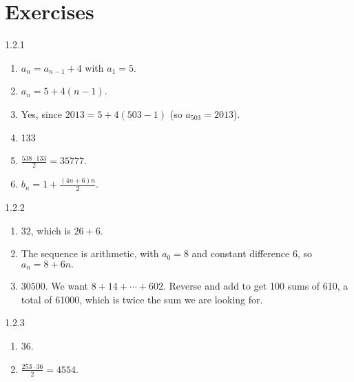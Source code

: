 \documentclass[11pt,]{book}
\theoremstyle{ptxplainnotitle}
\theoremstyle{ptxplaintitle}
\theoremstyle{ptxdefinitionnotitle}
\theoremstyle{ptxdefinitiontitle}
\theoremstyle{ptxdefinitionnotitle}
\theoremstyle{ptxdefinitiontitle}
\theoremstyle{ptxdefinitionnotitle}
\theoremstyle{ptxdefinitiontitle}
\theoremstyle{ptxdefinitiontitlenonumber}
\theoremstyle{ptxdefinitiontitlenonumber}
\numberwithin{equation}{chapter}
\begin{document}
\section*{Exercises}
\begin{divisionexercise}{1.2.1}
\textbf{}\hypertarget{p-228}{}%
\leavevmode%
\begin{enumerate}[label=(\alph*)]
\item\hypertarget{li-126}{}\(a_n = a_{n-1} + 4\) with \(a_1 = 5\).%
\item\hypertarget{li-127}{}\(a_n = 5 + 4(n-1)\).%
\item\hypertarget{li-128}{}\hypertarget{p-229}{}%
Yes, since \(2013 = 5 + 4(503-1)\) (so \(a_{503} = 2013\)).%
\item\hypertarget{li-129}{}\hypertarget{p-230}{}%
133%
\item\hypertarget{li-130}{}\(\frac{538\cdot 133}{2} = 35777\).%
\item\hypertarget{li-131}{}\(b_n = 1 + \frac{(4n+6)n}{2}\).%
\end{enumerate}
%
\end{divisionexercise}%
\begin{divisionexercise}{1.2.2}
\textbf{}\hypertarget{p-245}{}%
\leavevmode%
\begin{enumerate}[label=(\alph*)]
\item\hypertarget{li-141}{}\hypertarget{p-246}{}%
\(32\text{,}\) which is \(26+6\text{.}\)%
\item\hypertarget{li-142}{}\hypertarget{p-247}{}%
The sequence is arithmetic, with \(a_0 = 8\) and constant difference 6, so \(a_n = 8 + 6n\text{.}\)%
\item\hypertarget{li-143}{}\hypertarget{p-248}{}%
\(30500\text{.}\)  We want \(8 + 14 + \cdots + 602\text{.}\)  Reverse and add to get 100 sums of 610, a total of 61000, which is twice the sum we are looking for.%
\end{enumerate}
%
\end{divisionexercise}%
\begin{divisionexercise}{1.2.3}
\textbf{}\hypertarget{p-261}{}%
\leavevmode%
\begin{enumerate}[label=(\alph*)]
\item\hypertarget{li-150}{}\hypertarget{p-262}{}%
36.%
\item\hypertarget{li-151}{}\hypertarget{p-263}{}%
\(\frac{253 \cdot 36}{2} = 4554\text{.}\)%
\end{enumerate}
%
\end{divisionexercise}%
\end{document}
